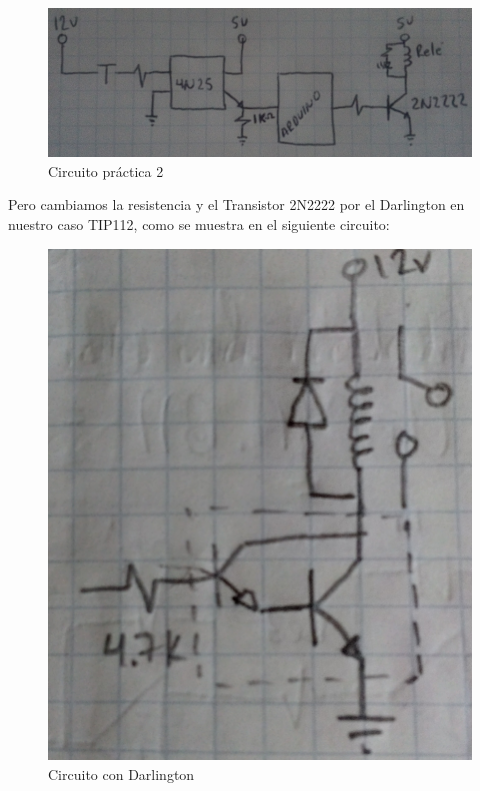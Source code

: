 \documentclass[10pt,a4paper]{article}
\begin{document}
\begin{figure}[hbtp]
\centering
\includegraphics[scale=0.5]{Pictures/Circuito1.PNG}
\caption{Circuito práctica 2}
\end{figure}
Pero cambiamos la resistencia y el Transistor 2N2222 por el Darlington en nuestro caso TIP112, como se muestra en el siguiente circuito: 
\begin{figure}[hbtp]
\centering
\includegraphics[scale=0.06]{Pictures/Circuito 2}
\caption{Circuito con Darlington}
\end{figure}
\end{document}
